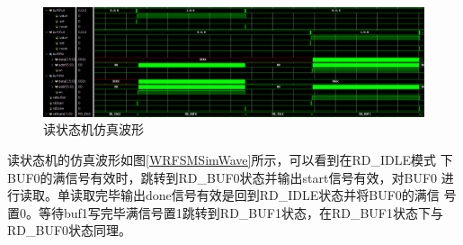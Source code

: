 \documentclass{article}
\numberwithin {equation}{section}
\begin{document}
\begin{spacing}{1.25}
      \begin{figure}[H]
        \centering
        \includegraphics[scale=0.25]{./pictures/rdFSMSim.png}
        \caption{读状态机仿真波形}
        \label{RdFSMSimWave}
      \end{figure}
      读状态机的仿真波形如图\ref{WRFSMSimWave}所示，可以看到在RD\_IDLE模式
      下BUF0的满信号有效时，跳转到RD\_BUF0状态并输出start信号有效，对BUF0
      进行读取。单读取完毕输出done信号有效是回到RD\_IDLE状态并将BUF0的满信
      号置0。等待buf1写完毕满信号置1跳转到RD\_BUF1状态，在RD\_BUF1状态下与
      RD\_BUF0状态同理。

\end{spacing}
\end{document}
